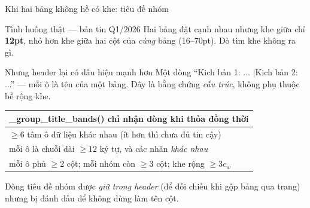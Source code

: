 \documentclass[aspectratio=169,11pt]{beamer}
\newcommand{\src}[1]{{\footnotesize\ttfamily #1}}
\begin{document}
\begin{frame}{Khi hai bảng không hề có khe: tiêu đề nhóm}
  \begin{alertblock}{\small Tình huống thật — bản tin Q1/2026}
    Hai bảng đặt cạnh nhau nhưng khe giữa chỉ \textbf{12pt}, nhỏ hơn khe giữa hai
    cột của \emph{cùng} bảng (16--70pt). Dò tìm khe không ra gì.
  \end{alertblock}
  \begin{block}{\small Nhưng header lại có dấu hiệu mạnh hơn}
    Một dòng ``Kich bản 1: ... \quad|\quad Kich bản 2: ...'' — mỗi ô là tên của
    một bảng. Đây là bằng chứng \emph{cấu trúc}, không phụ thuộc bề rộng khe.
  \end{block}
  \vspace{0.2em}
  \centering
  {\footnotesize
  \begin{tabular}{@{}l@{}}
    \toprule
    \textbf{\src{\_group\_title\_bands()} chỉ nhận dòng khi thỏa đồng thời} \\
    \midrule
    $\ge 6$ tâm ô dữ liệu khác nhau \quad (ít hơn thì chưa đủ tin cậy) \\
    mỗi ô là chuỗi dài $\ge 12$ ký tự, và các nhãn \emph{khác nhau} \\
    mỗi ô phủ $\ge 2$ cột; mỗi nhóm còn $\ge 3$ cột; khe rộng $\ge 3c_w$ \\
    \bottomrule
  \end{tabular}}
  \vspace{0.3em}
  {\footnotesize
  Dòng tiêu đề nhóm được \emph{giữ trong header} (để đối chiếu khi gộp bảng qua
  trang) nhưng bị đánh dấu để không dùng làm tên cột.}
\end{frame}
\end{document}
